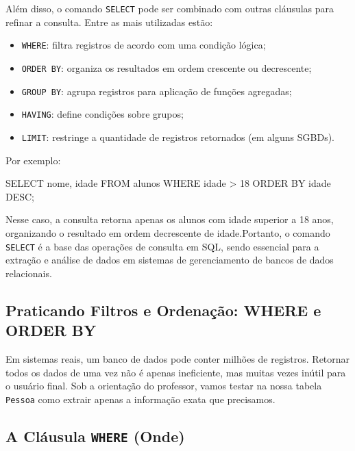 Além disso, o comando \texttt{SELECT} pode ser combinado com outras cláusulas para refinar a consulta. Entre as mais utilizadas estão:

\begin{itemize}
    \item \texttt{WHERE}: filtra registros de acordo com uma condição lógica;
    \item \texttt{ORDER BY}: organiza os resultados em ordem crescente ou decrescente;
    \item \texttt{GROUP BY}: agrupa registros para aplicação de funções agregadas;
    \item \texttt{HAVING}: define condições sobre grupos;
    \item \texttt{LIMIT}: restringe a quantidade de registros retornados (em alguns SGBDs).
\end{itemize}

Por exemplo:

\begin{sqlcode}
SELECT nome, idade
FROM alunos
WHERE idade > 18
ORDER BY idade DESC;
\end{sqlcode}

Nesse caso, a consulta retorna apenas os alunos com idade superior a 18 anos, organizando o resultado em ordem decrescente de idade.Portanto, o comando \texttt{SELECT} é a base das operações de consulta em SQL, sendo essencial para a extração e análise de dados em sistemas de gerenciamento de bancos de dados relacionais.

\subsection{Praticando Filtros e Ordenação: WHERE e ORDER BY}

\begin{tcolorbox}[colback=blue!5,colframe=blue!40!black,title=Exercício Dirigido com o Professor: Refinando a Busca]
Em sistemas reais, um banco de dados pode conter milhões de registros. Retornar todos os dados de uma vez não é apenas ineficiente, mas muitas vezes inútil para o usuário final. Sob a orientação do professor, vamos testar na nossa tabela \texttt{Pessoa} como extrair apenas a informação exata que precisamos.
\end{tcolorbox}

\subsection{A Cláusula \texttt{WHERE} (Onde)}

